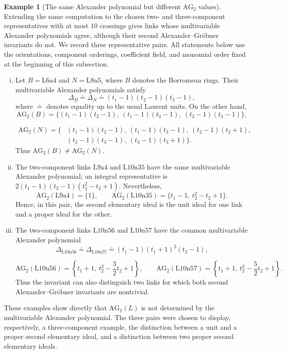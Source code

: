 \documentclass{article}
\theoremstyle{definition}
\newtheorem{example}[definition]{Example}
\theoremstyle{plain}
\newcommand{\AG}{\mathrm{AG}}
\begin{document}
\begin{example}[The same Alexander polynomial but different \(\AG_2\) values]
\label{ex:AG-refines-Alexander}
Extending the same computation to the chosen two- and three-component
representatives with at most \(10\) crossings gives links whose
multivariable Alexander polynomials agree, although their second
Alexander--Gr\"obner invariants do not. We record three representative
pairs. All statements below use the orientations, component orderings,
coefficient field, and monomial order fixed at the beginning of this
subsection.

\begin{enumerate}[(i)]
\item Let \(B=\mathrm{L6a4}\) and \(N=\mathrm{L8n5}\),
where \(B\) denotes the Borromean rings. Their multivariable Alexander
polynomials satisfy
\[
 \Delta_B\doteq\Delta_N
 \doteq (t_1-1)(t_2-1)(t_3-1),
\]
where \(\doteq\) denotes equality up to the usual Laurent units. On the
other hand,
\[
 \AG_2(B)
 =\bigl\{
 (t_1-1)(t_2-1),\
 (t_1-1)(t_3-1),\
 (t_2-1)(t_3-1)
 \bigr\},
\]

\begin{align*}
 \AG_2(N)
 =\bigl\{&
 (t_1-1)(t_2-1),\
 (t_1-1)(t_3-1),\
 (t_2-1)(t_2+1),\\
 & (t_2-1)(t_3-1),\
 (t_3-1)(t_3+1)
 \bigr\}.
\end{align*}
Thus \(\AG_2(B)\ne\AG_2(N)\).

\item The two-component links \(\mathrm{L9a4}\) and \(\mathrm{L10n35}\)
have the same multivariable Alexander polynomial; an integral representative
is \(2(t_1-1)(t_2-1)(t_2^2-t_2+1)\).  Nevertheless,
\[
 \AG_2(\mathrm{L9a4})=\{1\},
 \qquad
 \AG_2(\mathrm{L10n35})
 =\{t_1-1,\ t_2^2-t_2+1\}.
\]
Hence, in this pair, the second elementary ideal is the unit ideal for one
link and a proper ideal for the other.

\item The two-component links \(\mathrm{L10n56}\) and \(\mathrm{L10n57}\)
have the common multivariable Alexander polynomial
\[
 \Delta_{\mathrm{L10n56}}\doteq\Delta_{\mathrm{L10n57}}
 \doteq (t_1-1)(t_1+1)^2(t_2-1),
\]

\[
 \AG_2(\mathrm{L10n56})
 =\left\{t_1+1,\ t_2^2-\frac32t_2+1\right\}, \qquad 
 \AG_2(\mathrm{L10n57})
 =\left\{t_1+1,\ t_2^2-\frac52t_2+1\right\}.
\]
Thus the invariant can also distinguish two links for which both second
Alexander--Gr\"obner invariants are nontrivial.
\end{enumerate}

These examples show directly that \(\AG_2(L)\) is not determined by the
multivariable Alexander polynomial. The three pairs were chosen to display,
respectively, a three-component example, the distinction between a unit and
a proper second elementary ideal, and a distinction between two proper
second elementary ideals.
\end{example}
\end{document}
